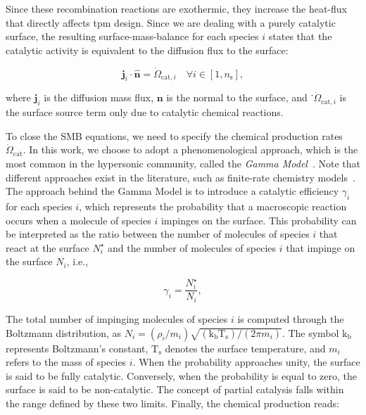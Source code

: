 Since these recombination reactions are exothermic, they increase the heat-flux that directly affects \gls{tpm} design. Since we are dealing with a purely catalytic surface, the resulting surface-mass-balance for each species $i$ states that the catalytic activity is equivalent to the diffusion flux to the surface: 

\begin{equation}
    \textbf{j}_i \cdot \hat{\textbf{n}} = \dot{\Omega}_{\text{cat},i} \quad \forall i \in [1, n_{\text{s}}],
    \label{eq:SMB}
\end{equation}

where $\textbf{j}_i$ is the diffusion mass flux, $\textbf{n}$ is the normal to the surface, and ˙$\dot{\Omega}_{\text{cat},i}$ is the surface source term only due to catalytic chemical reactions. 

To close the SMB equations, we need to specify the chemical production rates $\dot{\Omega}_{\text{cat}}$. In this work, we choose to adopt a phenomenological approach, which is the most common in the hypersonic community, called the \textit{Gamma Model}~\cite{GammaModel}. Note that different approaches exist in the literature, such as finite-rate chemistry models~\cite{FRC}. The approach behind the Gamma Model is to introduce a catalytic efficiency $\gamma_i$ for each species $i$, which represents the probability that a macroscopic reaction occurs when a molecule of species $i$ impinges on the surface. This probability can be interpreted as the ratio between the number of molecules of species $i$ that react at the surface $N_i^{\star}$ and the number of molecules of species $i$ that impinge on the surface $N_i$, i.e.,


\begin{equation}
    \gamma_i=\dfrac{N_i^{\star}}{N_i},
\end{equation}

The total number of impinging molecules of species $i$ is computed through the Boltzmann distribution, as $N_i=(\rho_i/m_i)\sqrt{(\mathrm{k}_{\text{b}}\mathrm{T}_\text{s})/(2\pi m_i)}$. The symbol $\mathrm{k}_{\text{b}}$ represents Boltzmann's constant, $\mathrm{T}_{\text{s}}$ denotes the surface temperature, and $m_i$ refers to the mass of species $i$. When the probability approaches unity, the surface is said to be fully catalytic. Conversely, when the probability is equal to zero, the surface is said to be non-catalytic. The concept of partial catalysis falls within the range defined by these two limits. Finally, the chemical production reads: 

